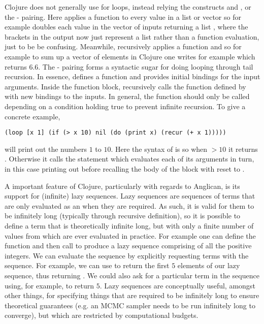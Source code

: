 Clojure does not generally use
for loops, instead relying the constructs \map and \reduce, or the - pairing. Here
\map applies a function to every value in a list or vector so for example {\small {}}
doubles each value in the vector of inputs returning a list {\small {}}, where the brackets in the output
now just represent a list rather than a function evaluation, just to be be confusing.  Meanwhile, \reduce recursively applies
a function and so for example to sum up a vector of elements in Clojure one writes for example
{\small {}} which returns 6.6.  The - pairing forms
a syntactic sugar for doing looping through tail recursion.  In essence,  defines a function and provides
initial bindings for the input arguments.  Inside the  function block,  recursively calls the
function defined by  with new bindings to the inputs.  In general, the  function should
only be called depending on a condition holding true to prevent infinite recursion.  To give a concrete example,
 \begin{lstlisting}[basicstyle=\ttfamily\small,frame=none]
 (loop [x 1] (if (> x 10) nil (do (print x) (recur (+ x 1)))))
 \end{lstlisting}\vspace{-5pt}
will print out the numbers $1$ to $10$.  Here the syntax of  is  so when $>10$
it returns .  Otherwise it calls the  statement which evaluates each of its arguments in turn, in
this case printing out  before recalling the body of the  block with   reset to .

A important feature of Clojure, particularly with regards to Anglican, is its support for (infinite) lazy sequences.
Lazy sequences are sequences of terms that are only evaluated as an when they are required.  As such, it is 
valid for them to be infinitely long (typically through recursive definition), so it is possible to define a term that is theoretically infinite long, but with only a finite number
of values from which are ever evaluated in practice.    For example one can define the function
 {\small {}} and then call {\small {}} to produce a
lazy sequence comprising of all the positive integers.  We can evaluate the sequence by explicitly requesting
terms with the sequence.  For example, we can use {\small {}} to return the first $5$ elements
of our lazy sequence, thus returning {\small {}}.  We could also ask for a particular term in the
sequence using, for example, {\small {}} to return $5$.
Lazy sequences are conceptually useful, amongst other things, for specifying things that
are required to be infinitely long to ensure theoretical guarantees (e.g. an MCMC sampler needs to be run
infinitely long to converge), but which are restricted by computational budgets.

